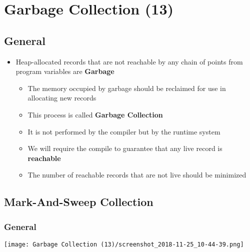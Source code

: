 \documentclass[11pt]{article}
\begin{document}
\section{Garbage Collection (13)}
\label{sec:org6b8ebe1}
\subsection{General}
\label{sec:org500e045}
\begin{itemize}
\item Heap-allocated records that are not reachable by any chain of points from program variables are \textbf{Garbage}
\begin{itemize}
\item The memory occupied by garbage should be reclaimed for use in allocating new records
\item This process is called \textbf{Garbage Collection}
\item It is not performed by the compiler but by the runtime system
\item We will require the compile to guarantee that any live record is \textbf{reachable}
\item The number of reachable records that are not live should be minimized
\end{itemize}
\end{itemize}

\subsection{Mark-And-Sweep Collection}
\label{sec:orgce8b9e1}
\subsubsection{General}
\label{sec:org08f5f67}
\begin{center}
\texttt{[image: Garbage Collection (13)/screenshot\_2018-11-25\_10-44-39.png]}
\end{center}
\end{document}
